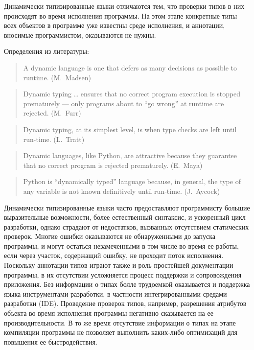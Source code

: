 Динамически типизированные языки отличаются тем, что проверки типов в них
происходят во время исполнения программы. На этом этапе конкретные типы всех
объектов в программе уже известны среде исполнения, и аннотации, вносимые
программистом, оказываются не нужны. 

Определения из литературы:

\begin{quote}
A dynamic language is one that defers as many decisions as possible to runtime.
(M.~Madsen)
\end{quote}

\begin{quote}
Dynamic typing … ensures that no correct program execution is stopped
prematurely — only programs about to “go wrong” at runtime are rejected.
(M.~Furr)
\end{quote}


\begin{quote}
Dynamic typing, at its simplest level, is when type checks are left until
run-time. (L.~Tratt)
\end{quote}

\begin{quote}
Dynamic languages, like Python, are attractive because they guarantee that no
correct program is rejected prematurely. (E.~Maya)
\end{quote}

\begin{quote}
Python is “dynamically typed” language because, in general, the type of any
variable is not known definitively until run-time. (J.~Aycock)
\end{quote}

Динамически типизированные языки часто предоставляют программисту большие
выразительные возможности, более естественный синтаксис, и ускоренный цикл
разработки, однако страдают от недостатков, вызванных отсутствием статических
проверок. Многие ошибки оказываются не обнаруженными до запуска программы, и
могут остаться незамеченными в том числе во время ее работы, если через участок,
содержащий ошибку, не проходит поток исполнения. Поскольку аннотации типов
играют также и роль простейшей документации программы, в их отсутствии
усложняется процесс поддержки и сопровождения приложения.  Без информации о
типах болле трудоемкой оказывается и поддержка языка инструментами разработки, в
частности интегрированными средами разработки (IDE). Проведение проверок типов,
например, разрешения атрибутов объекта во время исполнения программы негативно
сказывается на ее производительности. В то же время отсутствие информации о
типах на этапе компиляции программы не позволяет выполнить каких-либо
оптимизаций для повышения ее быстродействия.

